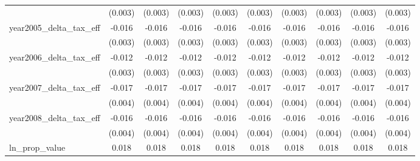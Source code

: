 {\begin{tabular}{l*{9}{c}}
            &     (0.003)         &     (0.003)         &     (0.003)         &     (0.003)         &     (0.003)         &     (0.003)         &     (0.003)         &     (0.003)         &     (0.003)         \\
[1em]
year2005_delta_tax_eff&      -0.016\sym{***}&      -0.016\sym{***}&      -0.016\sym{***}&      -0.016\sym{***}&      -0.016\sym{***}&      -0.016\sym{***}&      -0.016\sym{***}&      -0.016\sym{***}&      -0.016\sym{***}\\
            &     (0.003)         &     (0.003)         &     (0.003)         &     (0.003)         &     (0.003)         &     (0.003)         &     (0.003)         &     (0.003)         &     (0.003)         \\
[1em]
year2006_delta_tax_eff&      -0.012\sym{***}&      -0.012\sym{***}&      -0.012\sym{***}&      -0.012\sym{***}&      -0.012\sym{***}&      -0.012\sym{***}&      -0.012\sym{***}&      -0.012\sym{***}&      -0.012\sym{***}\\
            &     (0.003)         &     (0.003)         &     (0.003)         &     (0.003)         &     (0.003)         &     (0.003)         &     (0.003)         &     (0.003)         &     (0.003)         \\
[1em]
year2007_delta_tax_eff&      -0.017\sym{***}&      -0.017\sym{***}&      -0.017\sym{***}&      -0.017\sym{***}&      -0.017\sym{***}&      -0.017\sym{***}&      -0.017\sym{***}&      -0.017\sym{***}&      -0.017\sym{***}\\
            &     (0.004)         &     (0.004)         &     (0.004)         &     (0.004)         &     (0.004)         &     (0.004)         &     (0.004)         &     (0.004)         &     (0.004)         \\
[1em]
year2008_delta_tax_eff&      -0.016\sym{***}&      -0.016\sym{***}&      -0.016\sym{***}&      -0.016\sym{***}&      -0.016\sym{***}&      -0.016\sym{***}&      -0.016\sym{***}&      -0.016\sym{***}&      -0.016\sym{***}\\
            &     (0.004)         &     (0.004)         &     (0.004)         &     (0.004)         &     (0.004)         &     (0.004)         &     (0.004)         &     (0.004)         &     (0.004)         \\
[1em]
ln_prop_value&       0.018\sym{***}&       0.018\sym{***}&       0.018\sym{***}&       0.018\sym{***}&       0.018\sym{***}&       0.018\sym{***}&       0.018\sym{***}&       0.018\sym{***}&       0.018\sym{***}\\

\end{tabular}}
